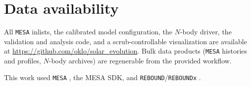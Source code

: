 \documentclass[twocolumn]{aastex631}
\newcommand{\code}[1]{\texttt{#1}}
\begin{document}
\section*{Data availability}

All \code{MESA} inlists, the calibrated model configuration, the $N$-body driver,
the validation and analysis code, and a scrub-controllable visualization are
available at \url{https://github.com/oklo/solar_evolution}. Bulk data products
(\code{MESA} histories and profiles, $N$-body archives) are regenerable from the
provided workflow.

\begin{acknowledgments}
This work used \code{MESA} \citep{Paxton2011,Paxton2019}, the MESA SDK, and
\code{REBOUND}/\code{REBOUNDx} \citep{ReinLiu2012,Tamayo2020}.
\end{acknowledgments}

\end{document}
